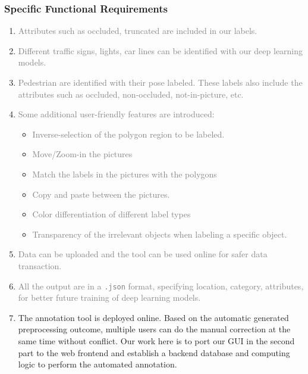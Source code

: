 \subsubsection{Specific Functional Requirements}
\begin{enumerate}
    \item \textcolor{gray}{Attributes such as occluded, truncated are included
in our labels. }
    \item \textcolor{gray}{Different traffic signs, lights, car lines can be
identified with our deep learning models.}
    \item \textcolor{gray}{Pedestrian are identified with their pose labeled.
These labels also include the attributes such as occluded, non-occluded,
not-in-picture, etc.}
    \item \textcolor{gray}{Some additional user-friendly features are
introduced:} \begin{itemize}
        \item \textcolor{gray}{Inverse-selection of the polygon region to be
labeled.}
        \item \textcolor{gray}{Move/Zoom-in the pictures}
        \item \textcolor{gray}{Match the labels in the pictures with the
polygons}
        \item \textcolor{gray}{Copy and paste between the pictures.}
        \item \textcolor{gray}{Color differentiation of different label types}
        \item \textcolor{gray}{Transparency of the irrelevant objects when
labeling a specific object. }
    \end{itemize}
    \item \textcolor{gray}{Data can be uploaded and the tool can be used online
for safer data transaction.}
    \item \textcolor{gray}{All the output are in a \texttt{.json} format,
specifying location, category, attributes, for better future training of deep
learning models.}

    \item The annotation tool is deployed online. Based on the automatic
generated preprocessing outcome, multiple users can do the manual correction at
the same time without conflict. Our work here is to port our GUI in the second
part to the web frontend and establish a backend database and computing logic
to perform the automated annotation.
\end{enumerate}


